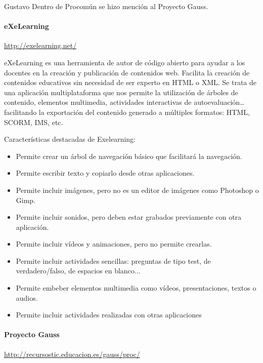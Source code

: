 \begin{opin}{\guscolor}{Gustavo}
Dentro de Procomún se hizo mención al Proyecto Gauss.

\paragraph{eXeLearning}
\url{http://exelearning.net/}

eXeLearning es una herramienta de autor de código abierto para ayudar a los docentes en la creación y publicación de contenidos web. Facilita la creación de contenidos educativos sin necesidad de ser experto en HTML o XML. Se trata de una aplicación multiplataforma que nos permite la utilización de árboles de contenido, elementos multimedia, actividades interactivas de autoevaluación… facilitando la exportación del contenido generado a múltiples formatos: HTML, SCORM, IMS, etc.

Características destacadas de Exelearning:
\begin{itemize}
\item Permite crear un árbol de navegación básico que facilitará la navegación.  

\item Permite escribir texto y copiarlo desde otras aplicaciones.  

\item Permite incluir imágenes, pero no es un editor de imágenes como Photoshop o Gimp.  

\item Permite incluir sonidos, pero deben estar grabados previamente con otra aplicación.  

\item Permite incluir vídeos y animaciones, pero no permite crearlas.  

\item Permite incluir actividades sencillas: preguntas de tipo test, de verdadero/falso, de espacios en blanco...  

\item Permite embeber elementos multimedia como vídeos, presentaciones, textos o audios.  

\item Permite incluir actividades realizadas con otras aplicaciones 
\end{itemize}


\paragraph{Proyecto Gauss}
\url{http://recursostic.educacion.es/gauss/proc/}


\end{opin}
